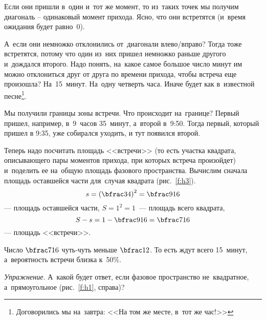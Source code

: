 Если они пришли в~один и~тот же момент, то из~таких точек мы получим диагональ -- одинаковый момент
прихода. Ясно, что они встретятся (и~время ожидания будет равно~0).

А~если они немножко отклонились от~диагонали влево/вправо? Тогда тоже встретятся, потому что один из~них
пришел немножко раньше другого и~дождался второго. Надо понять, на~какое самое большое число минут им
можно отклониться друг от друга по времени прихода, чтобы встреча еще произошла? На~15~минут. На~одну четверть часа. Иначе будет как
в~известной песне\footnote{Договорились мы на~завтра: <<На том же месте, в~тот же час!>>}.


Мы получили границы зоны встречи. Что происходит на~границе? Первый пришел, например, в~9~часов 35~минут,
а~второй в~9:50. Тогда  первый,
который пришел в 9:35, уже собирался уходить, и тут появился второй.

Теперь надо посчитать площадь <<встречи>> (то есть участка квадрата, описывающего пары моментов прихода, при которых
встреча произойдет) и~поделить ее на~общую площадь фазового пространства. Вычислим сначала площадь оставшейся части
для~случая квадрата (рис.~\ref{f:h3}).
$$
s=\left(\bfrac34\right)^{2} = \bfrac9{16}
$$
--- площадь оставшейся части,
$S = 1^{2} = 1$~--- площадь всего квадрата,
$$
S-s = 1-\bfrac9{16} = \bfrac7{16}
$$
--- площадь <<встречи>>.


Число $\bfrac7{16}$ чуть-чуть меньше $\bfrac12$. То есть ждут всего 15~минут, а~вероятность встречи близка к~50\%.

\textit{Упражнение.} А~какой будет ответ, если фазовое пространство не~квадратное, а~прямоугольное (рис.~\ref{f:h1},
справа)?

